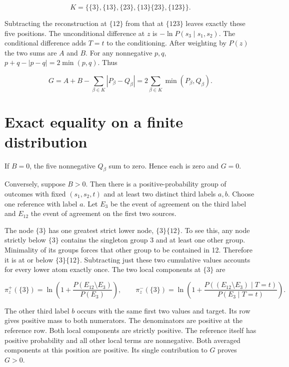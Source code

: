 \[
K=\{\{3\},\{13\},\{23\},\{13\}\{23\},\{123\}\}.
\]

Subtracting the reconstruction at \(\{12\}\) from that at \(\{123\}\) leaves exactly these five positions. The unconditional difference at \(z\) is \(-\ln P(s_3\mid s_1,s_2)\). The conditional difference adds \(T=t\) to the conditioning. After weighting by \(P(z)\) the two sums are \(A\) and \(B\). For any nonnegative \(p,q\), \(p+q-|p-q|=2\min(p,q)\). Thus

\[
G=A+B-\sum_{\beta\in K}|P_\beta-Q_\beta|
  =2\sum_{\beta\in K}\min(P_\beta,Q_\beta).
\]

\clearpage

\section{Exact equality on a finite distribution}\label{exact-equality-on-a-finite-distribution}

If \(B=0\), the five nonnegative \(Q_\beta\) sum to zero. Hence each is zero and \(G=0\).

Conversely, suppose \(B>0\). Then there is a positive-probability group of outcomes with fixed \((s_1,s_2,t)\) and at least two distinct third labels \(a,b\). Choose one reference with label \(a\). Let \(E_3\) be the event of agreement on the third label and \(E_{12}\) the event of agreement on the first two sources.

The node \(\{3\}\) has one greatest strict lower node, \(\{3\}\{12\}\). To see this, any node strictly below \(\{3\}\) contains the singleton group 3 and at least one other group. Minimality of its groups forces that other group to be contained in 12. Therefore it is at or below \(\{3\}\{12\}\). Subtracting just these two cumulative values accounts for every lower atom exactly once. The two local components at \(\{3\}\) are

\[
\pi_z^+(\{3\})=\ln\!\left(1+\frac{P(E_{12}\setminus E_3)}{P(E_3)}\right),\qquad
\pi_z^-(\{3\})=\ln\!\left(1+
\frac{P((E_{12}\setminus E_3)\mid T=t)}{P(E_3\mid T=t)}\right).
\]

The other third label \(b\) occurs with the same first two values and target. Its row gives positive mass to both numerators. The denominators are positive at the reference row. Both local components are strictly positive. The reference itself has positive probability and all other local terms are nonnegative. Both averaged components at this position are positive. Its single contribution to \(G\) proves \(G>0\).


